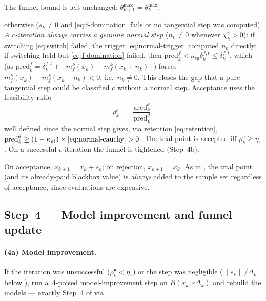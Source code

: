 \begin{description}
\begin{equation}
  \end{equation}
  The funnel bound is left unchanged: $\theta_{k+1}^{\max}=\theta_k^{\max}$.
\item[$c$-iteration] otherwise ($s_k\ne0$ and \eqref{eq:f-domination} fails or no
  tangential step was computed). \emph{A $c$-iteration always carries a genuine
  normal step} ($n_k\ne0$ whenever $\chi_k^c>0$): if switching \eqref{eq:switch}
  failed, the trigger \eqref{eq:normal-trigger} computed $n_k$ directly; if switching
  held but \eqref{eq:f-domination} failed, then $\mathrm{pred}^f_k<\kappa_{\mathrm{tg}}\delta^{f,t}_k\le\delta^{f,t}_k$,
  which (as $\mathrm{pred}^f_k=\delta^{f,t}_k+[m_f^k(x_k)-m_f^k(x_k+n_k)]$) forces
  $m_f^k(x_k)-m_f^k(x_k+n_k)<0$, i.e.\ $n_k\ne0$. This closes the gap that a pure
  tangential step could be classified $c$ without a normal step. Acceptance uses the
  feasibility ratio
  \begin{equation}
    \label{eq:rhoc}
    \rho^c_k \;=\; \frac{\mathrm{ared}^\theta_k}{\mathrm{pred}^\theta_k},
  \end{equation}
  well defined since the normal step gives, via retention \eqref{eq:retention},
  $\mathrm{pred}^\theta_k\ge(1-\kappa_{\mathrm{nt}})\times\eqref{eq:normal-cauchy}>0$.
  The trial point is accepted iff $\rho^c_k\ge\eta_1$. On a successful $c$-iteration
  the funnel is tightened (Step~4b).
\end{description}

On acceptance, $x_{k+1}=x_k+s_k$; on rejection, $x_{k+1}=x_k$. As in
, the trial point (and its already-paid blackbox value) is
\emph{always} added to the sample set regardless of acceptance, since evaluations
are expensive.

\subsection{Step~4 --- Model improvement and funnel update}
\label{sec:algo-improve}

\paragraph{(4a) Model improvement.} If the iteration was unsuccessful
($\rho^{\bullet}_k<\eta_1$) or the step was negligible
($\|s_k\|/\Delta_k$ below ), run a $\Lambda$-poised
model-improvement step on $B(x_k,r\Delta_k)$ and rebuild the models --- exactly
Step~4 of  via .

